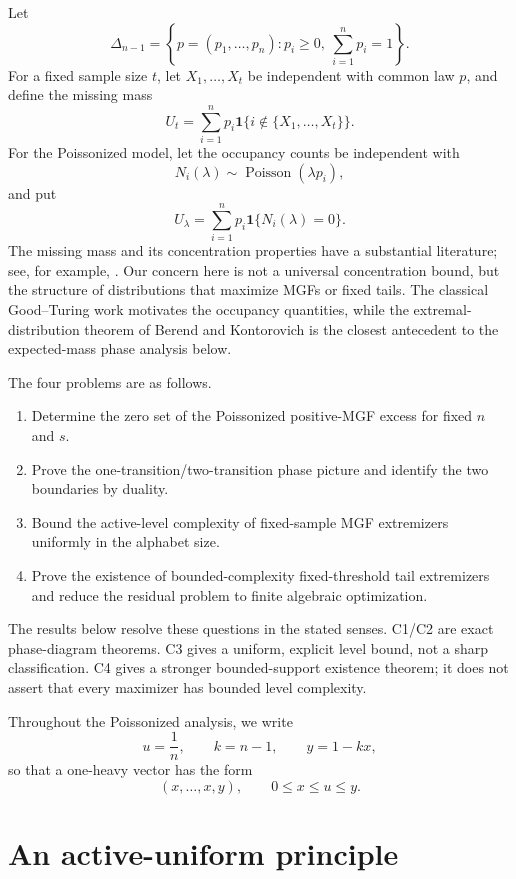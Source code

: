\documentclass[11pt]{article}
\theoremstyle{plain}
\theoremstyle{definition}
\theoremstyle{remark}
\newcommand{\one}{\mathbf 1}
\newcommand{\simplex}{\Delta_{n-1}}
\begin{document}
Let
\[
\simplex=\left\{p=(p_1,\ldots,p_n):p_i\ge0,\ \sum_{i=1}^n p_i=1\right\}.
\]
For a fixed sample size \(t\), let \(X_1,\ldots,X_t\) be independent with common law \(p\), and define the missing mass
\[
U_t=\sum_{i=1}^n p_i\one\{i\notin\{X_1,\ldots,X_t\}\}.
\]
For the Poissonized model, let the occupancy counts be independent with
\[
N_i(\lambda)\sim\operatorname{Poisson}(\lambda p_i),
\]
and put
\[
U_\lambda=\sum_{i=1}^n p_i\one\{N_i(\lambda)=0\}.
\]
The missing mass and its concentration properties have a substantial literature; see, for example, \cite{Good1953,McAllesterSchapire2000,McAllesterOrtiz2003,BerendKontorovich2012,BerendKontorovich2013,BenHamouBoucheronOhannessian2017}.  Our concern here is not a universal concentration bound, but the structure of distributions that maximize MGFs or fixed tails.  The classical Good--Turing work motivates the occupancy quantities, while the extremal-distribution theorem of Berend and Kontorovich \cite[Theorem~5]{BerendKontorovich2012} is the closest antecedent to the expected-mass phase analysis below.

The four problems are as follows.
\begin{enumerate}[label=\textbf{C\arabic*.},leftmargin=*]
\item Determine the zero set of the Poissonized positive-MGF excess for fixed \(n\) and \(s\).
\item Prove the one-transition/two-transition phase picture and identify the two boundaries by duality.
\item Bound the active-level complexity of fixed-sample MGF extremizers uniformly in the alphabet size.
\item Prove the existence of bounded-complexity fixed-threshold tail extremizers and reduce the residual problem to finite algebraic optimization.
\end{enumerate}

The results below resolve these questions in the stated senses.  C1/C2 are exact phase-diagram theorems.  C3 gives a uniform, explicit level bound, not a sharp classification.  C4 gives a stronger bounded-support existence theorem; it does not assert that every maximizer has bounded level complexity.

Throughout the Poissonized analysis, we write
\[
u=\frac1n,\qquad k=n-1,\qquad y=1-kx,
\]
so that a one-heavy vector has the form
\[
(x,\ldots,x,y),\qquad 0\le x\le u\le y.
\]

\section{An active-uniform principle}
\end{document}
